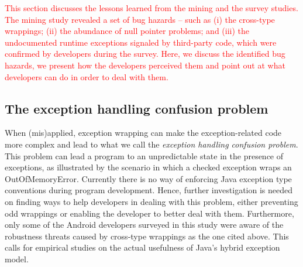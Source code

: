 \textcolor{red}{This section discusses the lessons learned from the mining and the survey studies. The mining study revealed a set of bug
hazards -- such as (i) the cross-type wrappings; (ii) the abundance of null pointer problems; and (iii) the undocumented runtime
exceptions signaled by third-party code, which were confirmed by developers
during the survey. Here, we discuss the identified bug hazards, we present how
the developers perceived them and point out at what developers can do in
order to deal with them.}


\subsection{The exception handling confusion problem}
When (mis)applied, exception wrapping can make the exception-related code
 more complex and lead to what we call the \emph{exception handling confusion problem}.
This problem can lead a program to an unpredictable state in the presence of exceptions,
as illustrated by the scenario in which a checked exception wraps an OutOfMemoryError.
Currently there is no way of enforcing Java exception type conventions during program development.
Hence, further investigation is needed on finding ways to help developers in dealing with this
 problem, either preventing odd wrappings or enabling the developer to
 better deal with them.
Furthermore, only some of the Android developers surveyed in this study were aware of the
robustness threats caused by cross-type wrappings as the one cited above. This calls for empirical studies on the actual usefulness of Java's hybrid exception model.


